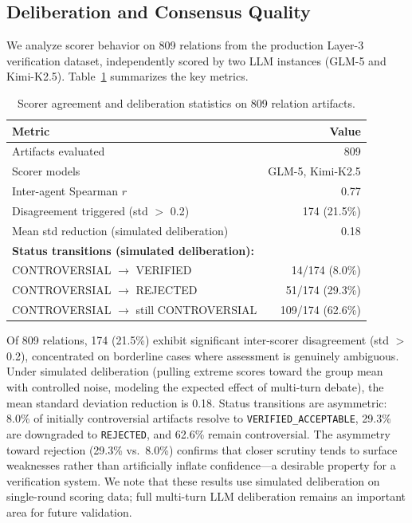 \documentclass[sigconf]{acmart}
\begin{document}
\subsection{Deliberation and Consensus Quality}

We analyze scorer behavior on 809 relations from the production Layer-3 verification dataset, independently scored by two LLM instances (GLM-5 and Kimi-K2.5). Table~\ref{tab:deliberation} summarizes the key metrics.

\begin{table}[t]
\caption{Scorer agreement and deliberation statistics on 809 relation artifacts.}
\label{tab:deliberation}
\centering
\begin{tabular}{l r}
\toprule
Metric & Value \\
\midrule
Artifacts evaluated & 809 \\
Scorer models & GLM-5, Kimi-K2.5 \\
Inter-agent Spearman $r$ & 0.77 \\
Disagreement triggered (std $>$ 0.2) & 174 (21.5\%) \\
Mean std reduction (simulated deliberation) & 0.18 \\
\midrule
\multicolumn{2}{l}{\textbf{Status transitions (simulated deliberation):}} \\
\quad CONTROVERSIAL $\rightarrow$ VERIFIED & 14/174 (8.0\%) \\
\quad CONTROVERSIAL $\rightarrow$ REJECTED & 51/174 (29.3\%) \\
\quad CONTROVERSIAL $\rightarrow$ still CONTROVERSIAL & 109/174 (62.6\%) \\
\bottomrule
\end{tabular}
\end{table}

Of 809 relations, 174 (21.5\%) exhibit significant inter-scorer disagreement (std $>$ 0.2), concentrated on borderline cases where assessment is genuinely ambiguous. Under simulated deliberation (pulling extreme scores toward the group mean with controlled noise, modeling the expected effect of multi-turn debate), the mean standard deviation reduction is 0.18. Status transitions are asymmetric: 8.0\% of initially controversial artifacts resolve to \texttt{VERIFIED\_ACCEPTABLE}, 29.3\% are downgraded to \texttt{REJECTED}, and 62.6\% remain controversial. The asymmetry toward rejection (29.3\% vs.\ 8.0\%) confirms that closer scrutiny tends to surface weaknesses rather than artificially inflate confidence---a desirable property for a verification system. We note that these results use simulated deliberation on single-round scoring data; full multi-turn LLM deliberation remains an important area for future validation.
\end{document}
